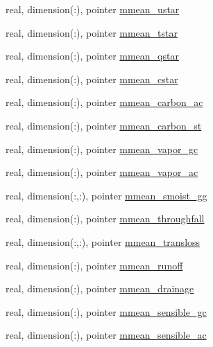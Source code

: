 \begin{DoxyCompactItemize}
\item 
real, dimension(\+:), pointer \hyperlink{structed__state__vars_1_1edtype_a738c50196354f21e4b61491d6863941a}{mmean\+\_\+ustar}
\item 
real, dimension(\+:), pointer \hyperlink{structed__state__vars_1_1edtype_a58d4b0a5e359604daaa55e5d2c65203d}{mmean\+\_\+tstar}
\item 
real, dimension(\+:), pointer \hyperlink{structed__state__vars_1_1edtype_a83bf3a721a30912c9040ee99f003e72b}{mmean\+\_\+qstar}
\item 
real, dimension(\+:), pointer \hyperlink{structed__state__vars_1_1edtype_a6c5f96e255ab39b78b87572b739cae94}{mmean\+\_\+cstar}
\item 
real, dimension(\+:), pointer \hyperlink{structed__state__vars_1_1edtype_ac8c8e82dae2c6b71eda4bd1fa16d103d}{mmean\+\_\+carbon\+\_\+ac}
\item 
real, dimension(\+:), pointer \hyperlink{structed__state__vars_1_1edtype_ad5a0b9de0d591e10eb6f76e9bafe3082}{mmean\+\_\+carbon\+\_\+st}
\item 
real, dimension(\+:), pointer \hyperlink{structed__state__vars_1_1edtype_a7e7c3b22e198be6c0a4fb690dd02520e}{mmean\+\_\+vapor\+\_\+gc}
\item 
real, dimension(\+:), pointer \hyperlink{structed__state__vars_1_1edtype_aa18284bc0121c0a7faabcd6d56027f29}{mmean\+\_\+vapor\+\_\+ac}
\item 
real, dimension(\+:,\+:), pointer \hyperlink{structed__state__vars_1_1edtype_a93e2b2f1a7b8df939eb9d99ac375f0d2}{mmean\+\_\+smoist\+\_\+gg}
\item 
real, dimension(\+:), pointer \hyperlink{structed__state__vars_1_1edtype_a04602a0b3b105e6bfddf146548c286ca}{mmean\+\_\+throughfall}
\item 
real, dimension(\+:,\+:), pointer \hyperlink{structed__state__vars_1_1edtype_a8b5e9713911aad121299a8f94490665c}{mmean\+\_\+transloss}
\item 
real, dimension(\+:), pointer \hyperlink{structed__state__vars_1_1edtype_a665323741783beff18676919fd228cab}{mmean\+\_\+runoff}
\item 
real, dimension(\+:), pointer \hyperlink{structed__state__vars_1_1edtype_aaef1e92585a18c279a6f3c4966ee463c}{mmean\+\_\+drainage}
\item 
real, dimension(\+:), pointer \hyperlink{structed__state__vars_1_1edtype_aaa16d428b74aed8ddcd7295c78af238b}{mmean\+\_\+sensible\+\_\+gc}
\item 
real, dimension(\+:), pointer \hyperlink{structed__state__vars_1_1edtype_af8af948c72097330caeabd441075b1ca}{mmean\+\_\+sensible\+\_\+ac}

\end{DoxyCompactItemize}
